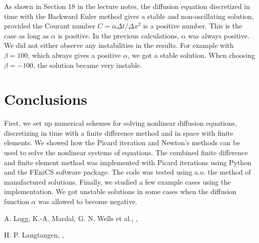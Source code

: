 \documentclass[twoside]{article}
\begin{document}
As shown in Section 18 in the lecture notes, the diffusion equation discretized in time with the Backward Euler method gives a stable and non-oscillating solution, provided the Courant number $C = \alpha \Delta t/\Delta x^{2}$ is a positive number. This is the case as long as $\alpha $ is positive. In the previous calculations, $\alpha $ was always positive. We did not either observe any instabilities in the results. For example with $\beta = 100$, which always gives a positive $\alpha$, we got a stable solution. When choosing $\beta = -100$, the solution became very instable.  

\section{Conclusions}

First, we set up numerical schemes for solving nonlinear diffusion equations, discretizing in time with a finite difference method and in space with finite elements. We showed how the Picard iteration and Newton's methods can be used to solve the nonlinear systems of equations. The combined finite difference and finite element method was implemented with Picard iterations using Python and the FEniCS software package. The code was tested using a.o. the method of manufactured solutions. Finally, we studied a few example cases using the implementation. We got unstable solutions in some cases when the diffusion function $\alpha $ was allowed to become negative.  


\printindex

\begin{thebibliography}{1}
    A. Logg, K.-A. Mardal, G. N. Wells et al., \newline
    , \newline

  H. P. Langtangen, \newline
  , \newline

\end{thebibliography}
\end{document}
